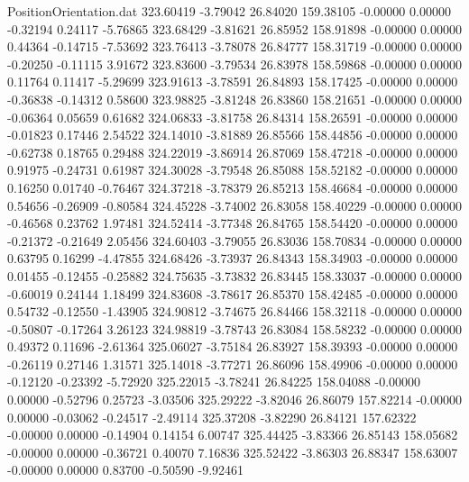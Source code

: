 \begin{filecontents}{PositionOrientation.dat}
 323.60419   -3.79042   26.84020   159.38105   -0.00000    0.00000   -0.32194    0.24117   -5.76865
 323.68429   -3.81621   26.85952   158.91898   -0.00000    0.00000    0.44364   -0.14715   -7.53692
 323.76413   -3.78078   26.84777   158.31719   -0.00000    0.00000   -0.20250   -0.11115    3.91672
 323.83600   -3.79534   26.83978   158.59868   -0.00000    0.00000    0.11764    0.11417   -5.29699
 323.91613   -3.78591   26.84893   158.17425   -0.00000    0.00000   -0.36838   -0.14312    0.58600
 323.98825   -3.81248   26.83860   158.21651   -0.00000    0.00000   -0.06364    0.05659    0.61682
 324.06833   -3.81758   26.84314   158.26591   -0.00000    0.00000   -0.01823    0.17446    2.54522
 324.14010   -3.81889   26.85566   158.44856   -0.00000    0.00000   -0.62738    0.18765    0.29488
 324.22019   -3.86914   26.87069   158.47218   -0.00000    0.00000    0.91975   -0.24731    0.61987
 324.30028   -3.79548   26.85088   158.52182   -0.00000    0.00000    0.16250    0.01740   -0.76467
 324.37218   -3.78379   26.85213   158.46684   -0.00000    0.00000    0.54656   -0.26909   -0.80584
 324.45228   -3.74002   26.83058   158.40229   -0.00000    0.00000   -0.46568    0.23762    1.97481
 324.52414   -3.77348   26.84765   158.54420   -0.00000    0.00000   -0.21372   -0.21649    2.05456
 324.60403   -3.79055   26.83036   158.70834   -0.00000    0.00000    0.63795    0.16299   -4.47855
 324.68426   -3.73937   26.84343   158.34903   -0.00000    0.00000    0.01455   -0.12455   -0.25882
 324.75635   -3.73832   26.83445   158.33037   -0.00000    0.00000   -0.60019    0.24144    1.18499
 324.83608   -3.78617   26.85370   158.42485   -0.00000    0.00000    0.54732   -0.12550   -1.43905
 324.90812   -3.74675   26.84466   158.32118   -0.00000    0.00000   -0.50807   -0.17264    3.26123
 324.98819   -3.78743   26.83084   158.58232   -0.00000    0.00000    0.49372    0.11696   -2.61364
 325.06027   -3.75184   26.83927   158.39393   -0.00000    0.00000   -0.26119    0.27146    1.31571
 325.14018   -3.77271   26.86096   158.49906   -0.00000    0.00000   -0.12120   -0.23392   -5.72920
 325.22015   -3.78241   26.84225   158.04088   -0.00000    0.00000   -0.52796    0.25723   -3.03506
 325.29222   -3.82046   26.86079   157.82214   -0.00000    0.00000   -0.03062   -0.24517   -2.49114
 325.37208   -3.82290   26.84121   157.62322   -0.00000    0.00000   -0.14904    0.14154    6.00747
 325.44425   -3.83366   26.85143   158.05682   -0.00000    0.00000   -0.36721    0.40070    7.16836
 325.52422   -3.86303   26.88347   158.63007   -0.00000    0.00000    0.83700   -0.50590   -9.92461

\end{filecontents}
